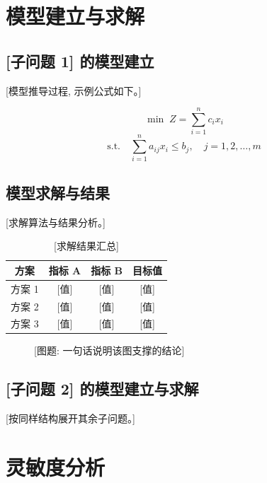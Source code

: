 \documentclass[zihao=-4,a4paper]{ctexart}
\begin{document}
\section{模型建立与求解}

\subsection{[子问题 1] 的模型建立}

[模型推导过程, 示例公式如下。]

\begin{equation}
  \min \; Z = \sum_{i=1}^{n} c_i x_i
\end{equation}
\begin{equation}
  \text{s.t.}\quad \sum_{i=1}^{n} a_{ij} x_i \le b_j, \quad j = 1,2,\dots,m
\end{equation}

\subsection{模型求解与结果}

[求解算法与结果分析。]

\begin{table}[H]
  \centering
  \caption{[求解结果汇总]}
  \begin{tabular}{cccc}
    \toprule
    方案 & 指标 A & 指标 B & 目标值 \\
    \midrule
    方案 1 & [值] & [值] & [值] \\
    方案 2 & [值] & [值] & [值] \\
    方案 3 & [值] & [值] & [值] \\
    \bottomrule
  \end{tabular}
\end{table}

\begin{figure}[H]
  \centering
  \caption{[图题: 一句话说明该图支撑的结论]}
\end{figure}

\subsection{[子问题 2] 的模型建立与求解}

[按同样结构展开其余子问题。]

\section{灵敏度分析}
\end{document}
